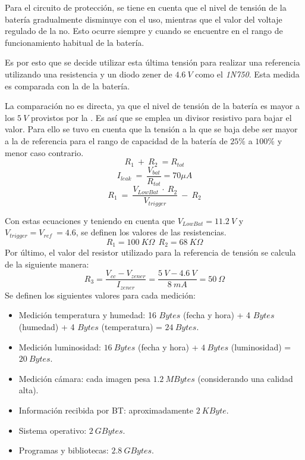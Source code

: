 Para el circuito de protección, se tiene en cuenta que el nivel de tensión de la batería gradualmente disminuye con el uso, mientras que el valor del voltaje regulado de la \rspi no. Esto ocurre siempre y cuando se encuentre en el rango de funcionamiento habitual de la batería.

Es por esto que se decide utilizar esta última tensión para realizar una referencia utilizando una resistencia y un diodo zener de $4.6 \ V$ como el \textit{1N750}. Esta medida es comparada con la de la  batería.

La comparación no es directa, ya que el nivel de tensión de la batería es mayor a los $5 \ V$ provistos por la \rspi. Es así que se emplea un divisor resistivo para bajar el valor. Para ello se tuvo en cuenta que la tensión a la que se baja debe ser mayor a la de referencia para el rango de capacidad de la batería de $25\%$ a $100\%$ y menor caso contrario.
\begin{equation}
R_1 \ +\ R_2 \ = R_{tot}
\end{equation}
\begin{equation}
I_{leak} \ = \ \frac{V_{bat}}{R_{tot}}  = 70 \mu A
\end{equation}
\begin{equation}
R_1 \ = \ \frac{V_{LowBat} \ \cdot \ R_2}{V_{trigger}} \ - \ R_2
\end{equation}

Con estas ecuaciones y teniendo en cuenta que $V_{LowBat} = 11.2 \ V$ y $V_{trigger} = V_{ref} \ = 4.6$, se definen los valores de las resistencias.
\begin{equation}
R_1 = 100 \ K\Omega  \ \ R_2 = 68 \ K\Omega
\end{equation}
Por último, el valor del resistor utilizado para la referencia de tensión se calcula de la siguiente manera:
\begin{equation}
	R_3 = \frac{V_{cc} - V_{zener}}{I_{zener}} = \frac{5 \ V - 4.6 \ V}{8 \ mA} = 50 \ \Omega
\end{equation}
Se definen los siguientes valores para cada medición:
\begin{itemize}

	\item Medición temperatura y humedad: 16 $Bytes$ (fecha y hora) + 4 $Bytes$ (humedad) + 4 $Bytes$ (temperatura) = $24 \ Bytes$.
	\item Medición luminosidad: $16 \ Bytes$ (fecha y hora) + $4 \ Bytes$ (luminosidad) = $20 \ Bytes$.
	\item Medición cámara: cada imagen pesa $1.2 \ MBytes$ \cite{ref:rpicam} (considerando una calidad alta).
	\item Información recibida por BT: aproximadamente $2 \ KByte$.
	\item Sistema operativo: $2 \ GBytes$.
	\item Programas y bibliotecas: $2.8 \ GBytes$.
\end{itemize}

